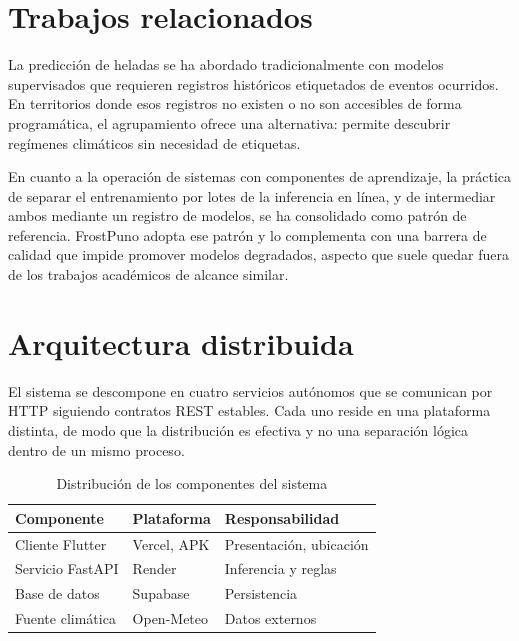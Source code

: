 \documentclass[conference]{IEEEtran}
\begin{document}
\section{Trabajos relacionados}

La predicci\'on de heladas se ha abordado tradicionalmente con modelos
supervisados que requieren registros hist\'oricos etiquetados de eventos
ocurridos. En territorios donde esos registros no existen o no son accesibles de
forma program\'atica, el agrupamiento ofrece una alternativa: permite descubrir
reg\'imenes clim\'aticos sin necesidad de etiquetas.

En cuanto a la operaci\'on de sistemas con componentes de aprendizaje, la
pr\'actica de separar el entrenamiento por lotes de la inferencia en l\'inea, y
de intermediar ambos mediante un registro de modelos, se ha consolidado como
patr\'on de referencia. FrostPuno adopta ese patr\'on y lo complementa con una
barrera de calidad que impide promover modelos degradados, aspecto que suele
quedar fuera de los trabajos acad\'emicos de alcance similar.

\section{Arquitectura distribuida}

El sistema se descompone en cuatro servicios aut\'onomos que se comunican por
HTTP siguiendo contratos REST estables. Cada uno reside en una plataforma
distinta, de modo que la distribuci\'on es efectiva y no una separaci\'on
l\'ogica dentro de un mismo proceso.

\begin{table}[htbp]
\caption{Distribuci\'on de los componentes del sistema}
\begin{center}
\begin{tabular}{@{}lll@{}}
\toprule
\textbf{Componente} & \textbf{Plataforma} & \textbf{Responsabilidad} \\
\midrule
Cliente Flutter & Vercel, APK & Presentaci\'on, ubicaci\'on \\
Servicio FastAPI & Render & Inferencia y reglas \\
Base de datos & Supabase & Persistencia \\
Fuente clim\'atica & Open-Meteo & Datos externos \\
\bottomrule
\end{tabular}
\label{tab:arquitectura}
\end{center}
\end{table}
\end{document}
